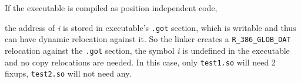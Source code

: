 \documentclass[twoside]{article}
\def\tts#1{\texttt{\small #1}}
\begin{document}
If the executable is compiled as position independent code,


the address of {\sl i} is stored in executable's \tts{.got} section,
which is writable and thus can have dynamic relocation against it.
So the linker creates a \tts{R\_386\_GLOB\_DAT} relocation against
the \tts{.got} section, the symbol {\sl i} is undefined in the executable
and no copy relocations are needed.  In this case, only \tts{test1.so}
will need 2 fixups, \tts{test2.so} will not need any.
\end{document}
